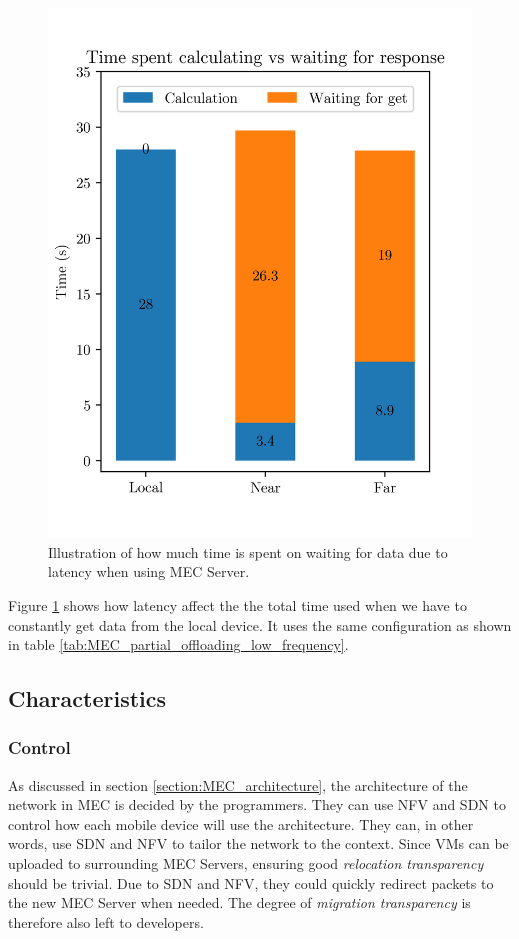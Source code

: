 \begin{figure}[t]
    \centering
    \includegraphics[scale=1]{chapters/6_evaluation/figures/MEC_Partial_bar.png}
    \caption{Illustration of how much time is spent on waiting for data due to latency when using MEC Server.}
    \label{fig:MEC_partial_bar}
\end{figure}

Figure \ref{fig:MEC_partial_bar} shows how latency affect the the total time used when we have to constantly get data from the local device. It uses the same configuration as shown in table \ref{tab:MEC_partial_offloading_low_frequency}.





\subsection{Characteristics}

\subsubsection{Control}
As discussed in section \ref{section:MEC_architecture}, the architecture of the network in MEC is decided by the programmers. They can use NFV and SDN to control how each mobile device will use the architecture. They can, in other words, use SDN and NFV to tailor the network to the context. Since VMs can be uploaded to surrounding MEC Servers, ensuring good \textit{relocation transparency} should be trivial. Due to SDN and NFV, they could quickly redirect packets to the new MEC Server when needed. The degree of \textit{migration transparency} is therefore also left to developers.

